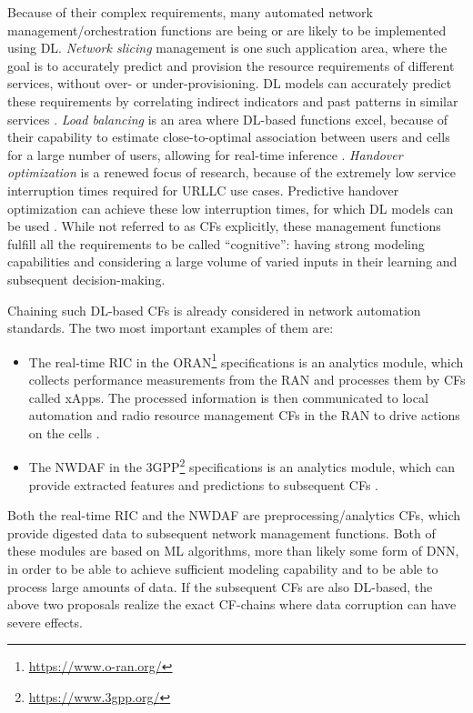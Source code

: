 				Because of their complex requirements, many automated network management/orchestration functions are being or are likely to be implemented using \ac{DL}.
				\textit{Network slicing} management is one such application area, where the goal is to accurately predict and provision the resource requirements of different services, without over- or under-provisioning.
				\ac{DL} models can accurately predict these requirements by correlating indirect indicators and past patterns in similar services \cite{netw_slicing_1, netw_slicing_2}.
				\textit{Load balancing} is an area where \ac{DL}-based functions excel, because of their capability to estimate close-to-optimal association between users and cells for a large number of users, allowing for real-time inference \cite{load_balancing_1, load_balancing_2}.
				\textit{Handover optimization} is a renewed focus of research, because of the extremely low service interruption times required for \ac{URLLC} use cases.
				Predictive handover optimization can achieve these low interruption times, for which \ac{DL} models can be used \cite{ho_opt_1, ho_opt_2}.			
				While not referred to as \acp{CF} explicitly, these management functions fulfill all the requirements to be called ``cognitive'': having strong modeling capabilities and considering a large volume of varied inputs in their learning and subsequent decision-making.		
				
				Chaining such \ac{DL}-based \acp{CF} is already considered in network automation standards.
				The two most important examples of them are:
				\begin{itemize}
					\item
						The real-time \ac{RIC} in the ORAN\footnote{\url{https://www.o-ran.org/}} specifications is an analytics module, which collects performance measurements from the \ac{RAN} and processes them by \acp{CF} called xApps.
						The processed information is then communicated to local automation and radio resource management \acp{CF} in the \ac{RAN} to drive actions on the cells \cite{ric}.
					
					\item
						The \ac{NWDAF} in the 3GPP\footnote{\url{https://www.3gpp.org/}} specifications is an analytics module, which can provide extracted features and predictions to subsequent \acp{CF} \cite{nwdaf}.
				\end{itemize}
				
				Both the real-time \ac{RIC} and the \ac{NWDAF} are preprocessing/analytics \acp{CF}, which provide digested data to subsequent network management functions.
				Both of these modules are based on \ac{ML} algorithms, more than likely some form of \ac{DNN}, in order to be able to achieve sufficient modeling capability and to be able to process large amounts of data.
				If the subsequent \acp{CF} are also \ac{DL}-based, the above two proposals realize the exact \ac{CF}-chains where data corruption can have severe effects.
				
